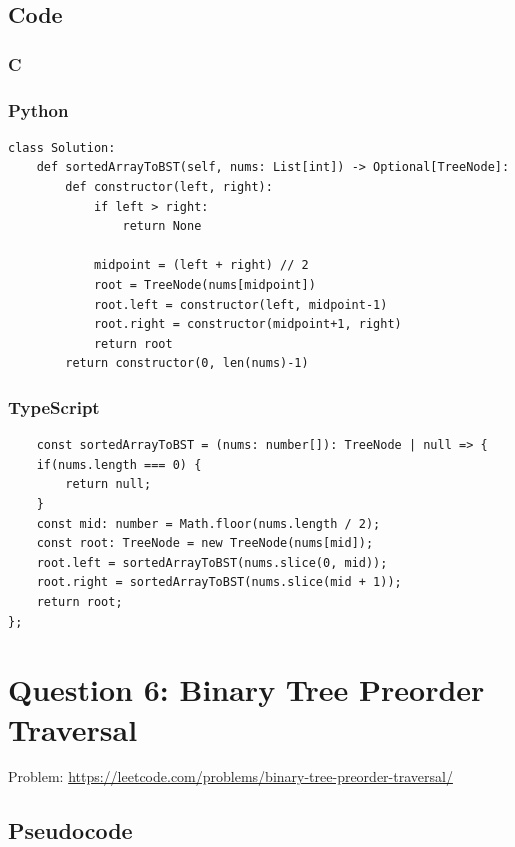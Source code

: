 \documentclass[11pt]{article}
\begin{document}
\subsection{Code}
\subsubsection{C}
\subsubsection{Python}

\begin{verbatim}
class Solution:
    def sortedArrayToBST(self, nums: List[int]) -> Optional[TreeNode]:
        def constructor(left, right):
            if left > right:
                return None

            midpoint = (left + right) // 2
            root = TreeNode(nums[midpoint])
            root.left = constructor(left, midpoint-1)
            root.right = constructor(midpoint+1, right)
            return root
        return constructor(0, len(nums)-1)
\end{verbatim}

\subsubsection{TypeScript}

\begin{verbatim}
    const sortedArrayToBST = (nums: number[]): TreeNode | null => {
    if(nums.length === 0) {
        return null;
    }
    const mid: number = Math.floor(nums.length / 2);
    const root: TreeNode = new TreeNode(nums[mid]);
    root.left = sortedArrayToBST(nums.slice(0, mid));
    root.right = sortedArrayToBST(nums.slice(mid + 1));
    return root;
};
\end{verbatim}

\newpage

\section{Question 6: Binary Tree Preorder Traversal}
Problem: \url{https://leetcode.com/problems/binary-tree-preorder-traversal/}

\subsection{Pseudocode}

\end{document}

